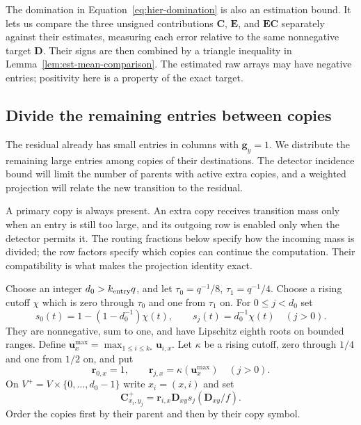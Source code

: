 \documentclass[11pt]{article}
\numberwithin{equation}{section}
\theoremstyle{definition}
\theoremstyle{remark}
\begin{document}
The domination in Equation~\eqref{eq:hier-domination} is also an
estimation bound.  It lets us compare the three unsigned contributions
${\mathbf{C}}$, ${\mathbf{E}}$, and ${\mathbf{E}}{\mathbf{C}}$ separately against their estimates, measuring each
error relative to the same nonnegative target ${\mathbf{D}}$.  Their signs are
then combined by a triangle inequality in
Lemma~\ref{lem:est-mean-comparison}.  The estimated raw arrays may have
negative entries; positivity here is a property of the exact target.

\subsection{Divide the remaining entries between copies}

The residual already has small entries in columns with ${\mathbf{g}}_{y}=1$.
We distribute the remaining large entries among copies of their
destinations.  The detector incidence bound will limit the number of
parents with active extra copies, and a weighted projection will relate
the new transition to the residual.

A primary copy is always present. An extra copy receives transition mass only when an entry is still too large, and its outgoing row is enabled only when the detector permits it. The routing fractions below specify how the incoming mass is divided; the row factors specify which copies can continue the computation. Their compatibility is what makes the projection identity exact.

Choose an integer ${d}_0>{k_{\rm entry}}q$, and let
$\tau_0=q^{-1}/8$, $\tau_1=q^{-1}/4$.
Choose a rising cutoff $\chi$ which is zero through $\tau_0$ and one
from $\tau_1$ on.  For $0\leq j<{d}_0$ set
\begin{equation}
 s_0(t)=1-(1-{d}_0^{-1})\chi(t),\qquad
 s_j(t)={d}_0^{-1}\chi(t)\quad(j>0).
 \label{eq:hier-routing-fractions}
\end{equation}
They are nonnegative, sum to one, and have Lipschitz eighth roots on
bounded ranges.  Define ${\mathbf{u}}^{\max}_{x}=\max_{1\leq i\leq k_*}{\mathbf{u}}_{i,x}$.
Let $\kappa$ be a rising cutoff, zero through $1/4$ and one from
$1/2$ on, and put
\begin{equation}
 {\mathbf{r}}_{0,x}=1,\qquad {\mathbf{r}}_{j,x}=\kappa({\mathbf{u}}^{\max}_{x})\quad(j>0).
 \label{eq:hier-copy-row-factors}
\end{equation}
On $V^+=V\times\{0,\ldots,{d}_0-1\}$ write $x_i=(x,i)$ and set
\begin{equation}
 {\mathbf{C}}^{+}_{x_i,y_j}={\mathbf{r}}_{i,x}{\mathbf{D}}_{xy}s_j({\mathbf{D}}_{xy}/f).
 \label{eq:hier-copy-transition}
\end{equation}
Order the copies first by their parent and then by their copy symbol.
\end{document}

